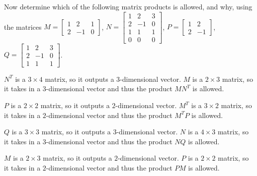 \documentclass{ximera}
\begin{document}
\begin{example}

        Now determine which of the following matrix products is allowed, and why, using the matrices %
        $M=\begin{bmatrix} 1 & 2 & 1\\ 2&-1 &0\end{bmatrix}$, $N=\begin{bmatrix} 1 & 2 & 3 \\ 2&-1 & 0 \\ 1 & 1 & 1 \\ 0 & 0 & 0\end{bmatrix}$, $P=\begin{bmatrix} 1 & 2 \\ 2&-1 \end{bmatrix}$, $Q=\begin{bmatrix} 1 & 2 & 3 \\ 2&-1 & 0 \\ 1 & 1 & 1\end{bmatrix}$.


        \begin{selectAll}


        \end{selectAll}

        \begin{feedback}
        
            $N^T$ is a $3\times 4$ matrix, so it outputs a $3$-dimensional vector. $M$ is a $2\times 3$ matrix, so it takes in a $3$-dimensional vector and thus the product $MN^T$ is allowed.

            $P$ is a $2\times 2$ matrix, so it outputs a $2$-dimensional vector. $M^T$ is a $3\times 2$ matrix, so it takes in a $2$-dimensional vector and thus the product $M^TP$ is allowed.

            $Q$ is a $3\times 3$ matrix, so it outputs a $3$-dimensional vector. $N$ is a $4\times 3$ matrix, so it takes in a $3$-dimensional vector and thus the product $NQ$ is allowed.

            $M$ is a $2\times 3$ matrix, so it outputs a $2$-dimensional vector. $P$ is a $2\times 2$ matrix, so it takes in a $2$-dimensional vector and thus the product $PM$ is allowed.

        \end{feedback}

    \end{example}
\end{document}
